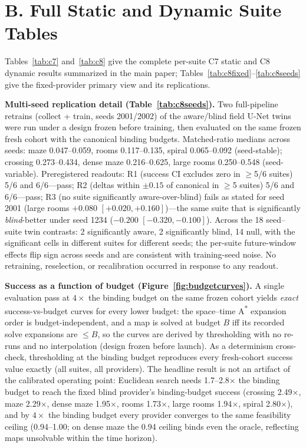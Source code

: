 \documentclass[letterpaper]{article} %
\newcommand{\stage}[1]{\textsc{#1}}
\begin{document}
\section{B. Full Static and Dynamic Suite Tables}

Tables~\ref{tab:c7} and~\ref{tab:c8} give the complete per-suite \stage{C7} static and \stage{C8} dynamic results summarized in the main paper; Tables~\ref{tab:c8fixed}--\ref{tab:c8seeds} give the fixed-provider primary view and its replications.

\textbf{Multi-seed replication detail (Table~\ref{tab:c8seeds}).} Two full-pipeline retrains (collect + train, seeds 2001/2002) of the aware/blind field U-Net twins were run under a design frozen before training, then evaluated on the same frozen fresh cohort with the canonical binding budgets. Matched-ratio medians across seeds: maze 0.047--0.059, rooms 0.117--0.135, spiral 0.065--0.092 (seed-stable); crossing 0.273--0.434, dense maze 0.216--0.625, large rooms 0.250--0.548 (seed-variable). Preregistered readouts: R1 (success CI excludes zero in $\geq$5/6 suites) 5/6 and 6/6---pass; R2 (deltas within $\pm 0.15$ of canonical in $\geq$5 suites) 5/6 and 6/6---pass; R3 (no suite significantly aware-over-blind) fails as stated for seed 2001 (large rooms $+0.080$ $[+0.020,+0.160]$)---the same suite that is significantly \emph{blind}-better under seed 1234 ($-0.200$ $[-0.320,-0.100]$). Across the 18 seed--suite twin contrasts: 2 significantly aware, 2 significantly blind, 14 null, with the significant cells in different suites for different seeds; the per-suite future-window effects flip sign across seeds and are consistent with training-seed noise. No retraining, reselection, or recalibration occurred in response to any readout.

\textbf{Success as a function of budget (Figure~\ref{fig:budgetcurves}).} A single evaluation pass at $4\times$ the binding budget on the same frozen cohort yields \emph{exact} success-vs-budget curves for every lower budget: the space--time A\textsuperscript{*} expansion order is budget-independent, and a map is solved at budget $B$ iff its recorded solve expansions are $\leq B$, so the curves are derived by thresholding with no re-runs and no interpolation (design frozen before launch). As a determinism cross-check, thresholding at the binding budget reproduces every fresh-cohort success value exactly (all suites, all providers). The headline result is not an artifact of the calibrated operating point: Euclidean search needs 1.7--2.8$\times$ the binding budget to reach the fixed blind provider's binding-budget success (crossing 2.49$\times$, maze 2.29$\times$, dense maze 1.95$\times$, rooms 1.73$\times$, large rooms 1.94$\times$, spiral 2.80$\times$), and by $4\times$ the binding budget every provider converges to the same feasibility ceiling (0.94--1.00; on dense maze the 0.94 ceiling binds even the oracle, reflecting maps unsolvable within the time horizon).
\end{document}
